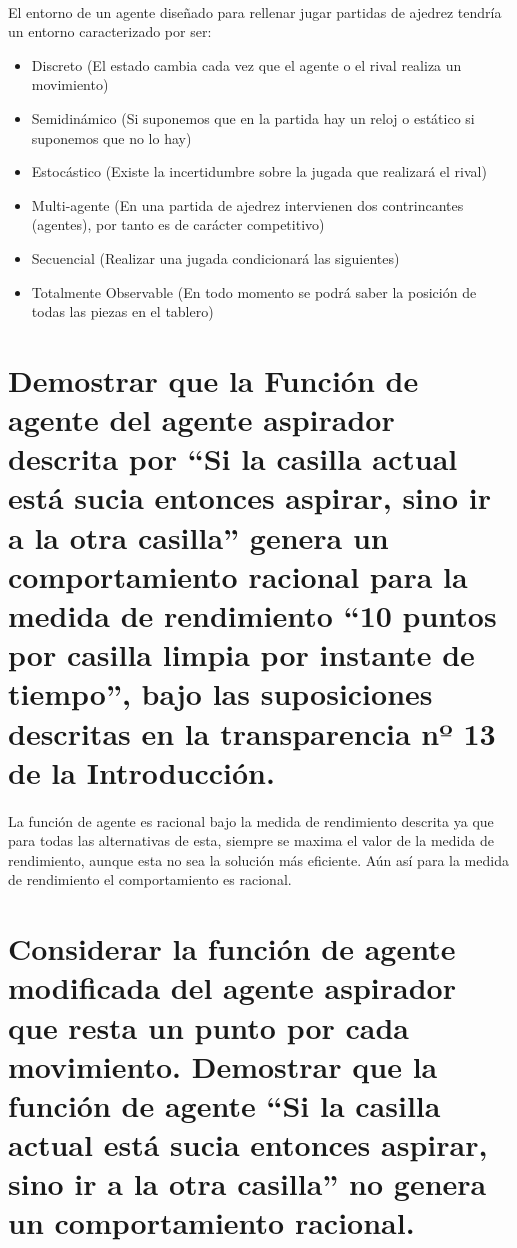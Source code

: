 \documentclass[10pt, a4paper,spanish]{article}
\begin{document}
		\paragraph{}
		El entorno de un agente diseñado para rellenar jugar partidas de ajedrez tendría un entorno caracterizado por ser:

		\begin{itemize}
			\item Discreto (El estado cambia cada vez que el agente o el rival realiza un movimiento)
			\item Semidinámico (Si suponemos que en la partida hay un reloj o estático si suponemos que no lo hay)
			\item Estocástico (Existe la incertidumbre sobre la jugada que realizará el rival)
			\item Multi-agente (En una partida de ajedrez intervienen dos contrincantes (agentes), por tanto es de carácter competitivo)
			\item Secuencial (Realizar una jugada condicionará las siguientes)
			\item Totalmente Observable (En todo momento se podrá saber la posición de todas las piezas en el tablero)
		\end{itemize}


	\section{Demostrar que la Función de agente del agente aspirador descrita por “Si la casilla actual está sucia entonces aspirar, sino ir a la otra casilla” genera un comportamiento racional para la medida de rendimiento “10 puntos por casilla limpia por instante de tiempo”, bajo las suposiciones descritas en la transparencia nº 13 de la Introducción.}

		\paragraph{}
		La función de agente es racional bajo la medida de rendimiento descrita ya que para todas las alternativas de esta, siempre se maxima el valor de la medida de rendimiento, aunque esta no sea la solución más eficiente. Aún así para la medida de rendimiento el comportamiento es racional.


	\section{Considerar la función de agente modificada del agente aspirador que resta un punto por cada movimiento. Demostrar que la función de agente “Si la casilla actual está sucia entonces aspirar, sino ir a la otra casilla” no genera un comportamiento racional.}
\end{document}
